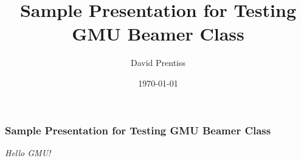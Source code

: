 \documentclass{beamer}
\title{Sample Presentation for Testing GMU Beamer Class}
\author{David Prentiss}
\institute{George Mason University}
\date{\today}
\begin{document}
\frame{\titlepage}

\begin{frame}
    \frametitle{Sample Presentation for Testing GMU Beamer Class}
    \em{Hello GMU!}
\end{frame}
\end{document}
